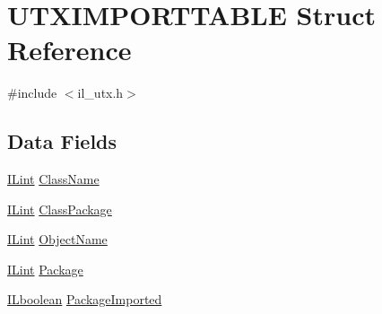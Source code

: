 \hypertarget{struct_u_t_x_i_m_p_o_r_t_t_a_b_l_e}{\section{U\-T\-X\-I\-M\-P\-O\-R\-T\-T\-A\-B\-L\-E Struct Reference}
\label{struct_u_t_x_i_m_p_o_r_t_t_a_b_l_e}
}


{\ttfamily \#include $<$il\-\_\-utx.\-h$>$}

\subsection*{Data Fields}
\begin{DoxyCompactItemize}
\item 
\hyperlink{il_8h_a288a97fb9e92e707a60b749d0039fafe}{I\-Lint} \hyperlink{struct_u_t_x_i_m_p_o_r_t_t_a_b_l_e_a818968f20687c3ae67953c76de70906f}{Class\-Name}
\item 
\hyperlink{il_8h_a288a97fb9e92e707a60b749d0039fafe}{I\-Lint} \hyperlink{struct_u_t_x_i_m_p_o_r_t_t_a_b_l_e_a6a90c0df9c252087b596f3008b244117}{Class\-Package}
\item 
\hyperlink{il_8h_a288a97fb9e92e707a60b749d0039fafe}{I\-Lint} \hyperlink{struct_u_t_x_i_m_p_o_r_t_t_a_b_l_e_add03264ed039d8c3724a94a83f6901ae}{Object\-Name}
\item 
\hyperlink{il_8h_a288a97fb9e92e707a60b749d0039fafe}{I\-Lint} \hyperlink{struct_u_t_x_i_m_p_o_r_t_t_a_b_l_e_a9a99ade7b9822fe672e4019bcb4c988c}{Package}
\item 
\hyperlink{il_8h_a8be80d75c2c636b9f2250fe10c2e7874}{I\-Lboolean} \hyperlink{struct_u_t_x_i_m_p_o_r_t_t_a_b_l_e_adafdd9e3f240a86c94fe9bbfb75faa5c}{Package\-Imported}
\end{DoxyCompactItemize}


